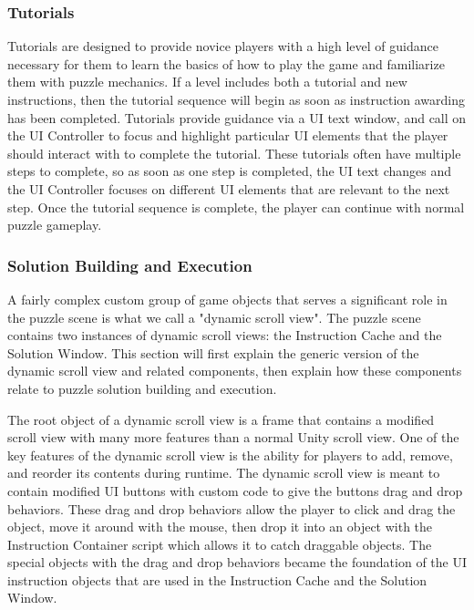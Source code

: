 \subsubsection{Tutorials}
Tutorials are designed to provide novice players with a high level of guidance necessary for them to learn the basics of how to play the game and familiarize them with puzzle mechanics. If a level includes both a tutorial and new instructions, then the tutorial sequence will begin as soon as instruction awarding has been completed. Tutorials provide guidance via a UI text window, and call on the UI Controller to focus and highlight particular UI elements that the player should interact with to complete the tutorial. These tutorials often have multiple steps to complete, so as soon as one step is completed, the UI text changes and the UI Controller focuses on different UI elements that are relevant to the next step. Once the tutorial sequence is complete, the player can continue with normal puzzle gameplay.




\subsubsection{Solution Building and Execution}

A fairly complex custom group of game objects that serves a significant role in the puzzle scene is what we call a "dynamic scroll view".
The puzzle scene contains two instances of dynamic scroll views: the Instruction Cache and the Solution Window. This section will first explain the generic version of the dynamic scroll view and related components, then explain how these components relate to puzzle solution building and execution.


The root object of a dynamic scroll view is a frame that contains a modified scroll view with many more features than a normal Unity scroll view. One of the key features of the dynamic scroll view is the ability for players to add, remove, and reorder its contents during runtime. The dynamic scroll view is meant to contain modified UI buttons with custom code to give the buttons drag and drop behaviors. These drag and drop behaviors allow the player to click and drag the object, move it around with the mouse, then drop it into an object with the Instruction Container script which allows it to catch draggable objects. The special objects with the drag and drop behaviors became the foundation of the UI instruction objects that are used in the Instruction Cache and the Solution Window.


